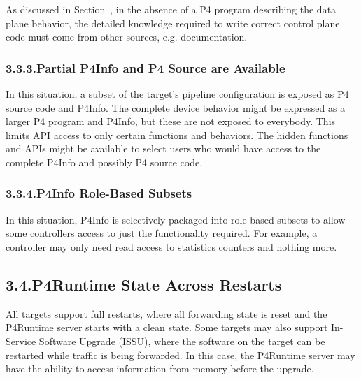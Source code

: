 \documentclass[11pt]{article}
\begin{document}
{%
\noindent{}As discussed in Section~, in the
absence of a P4 program describing the data plane behavior, the detailed
knowledge required to write correct control plane code must come from other
sources, e.g. documentation.%

\subsubsection{3.3.3.\hspace*{0.5em}Partial P4Info and P4 Source are Available}\label{sec-partial-p4info-and-p4-source-are-available}%

\noindent{}In this situation, a subset of the target's pipeline configuration is exposed as
P4 source code and P4Info. The complete device behavior might be expressed as a
larger P4 program and P4Info, but these are not exposed to everybody. This
limits API access to only certain functions and behaviors. The hidden functions
and APIs might be available to select users who would have access to the
complete P4Info and possibly P4 source code.%

\subsubsection{3.3.4.\hspace*{0.5em}P4Info Role-Based Subsets}\label{sec-p4info-role-based-subsets}%

\noindent{}In this situation, P4Info is selectively packaged into role-based subsets to
allow some controllers access to just the functionality required. For example, a
controller may only need read access to statistics counters and nothing more.%

\subsection{3.4.\hspace*{0.5em}P4Runtime State Across Restarts}\label{sec-restarts}%

\noindent{}All targets support full restarts, where all forwarding state is reset and the
P4Runtime server starts with a clean state.  Some targets may also support
In-Service Software Upgrade (ISSU), where the software on the target can be
restarted while traffic is being forwarded. In this case, the P4Runtime server
may have the ability to access information from memory before the upgrade.%

}
\end{document}
